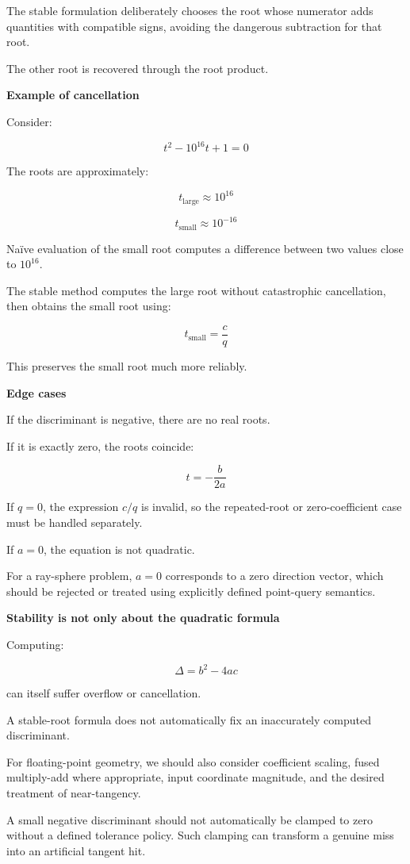 The stable formulation deliberately chooses the root whose numerator adds quantities with compatible signs, avoiding the dangerous subtraction for that root.

The other root is recovered through the root product.

\textbf{Example of cancellation}

Consider:

\[
t^2-10^{16}t+1=0
\]

The roots are approximately:

\[
t_{\mathrm{large}}\approx10^{16}
\]

\[
t_{\mathrm{small}}\approx10^{-16}
\]

Naïve evaluation of the small root computes a difference between two values close to \(10^{16}\).

The stable method computes the large root without catastrophic cancellation, then obtains the small root using:

\[
t_{\mathrm{small}}=\frac c q
\]

This preserves the small root much more reliably.

\textbf{Edge cases}

If the discriminant is negative, there are no real roots.

If it is exactly zero, the roots coincide:

\[
t=-\frac b{2a}
\]

If \(q=0\), the expression \(c/q\) is invalid, so the repeated-root or zero-coefficient case must be handled separately.

If \(a=0\), the equation is not quadratic.

For a ray-sphere problem, \(a=0\) corresponds to a zero direction vector, which should be rejected or treated using explicitly defined point-query semantics.

\textbf{Stability is not only about the quadratic formula}

Computing:

\[
\Delta=b^2-4ac
\]

can itself suffer overflow or cancellation.

A stable-root formula does not automatically fix an inaccurately computed discriminant.

For floating-point geometry, we should also consider coefficient scaling, fused multiply-add where appropriate, input coordinate magnitude, and the desired treatment of near-tangency.

A small negative discriminant should not automatically be clamped to zero without a defined tolerance policy. Such clamping can transform a genuine miss into an artificial tangent hit.

